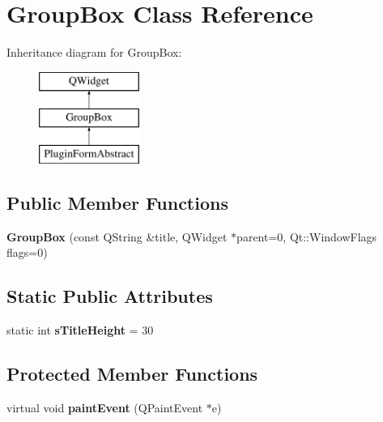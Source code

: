 \hypertarget{class_group_box}{\section{Group\-Box Class Reference}
\label{class_group_box}
}
Inheritance diagram for Group\-Box\-:\begin{figure}[H]
\begin{center}
\leavevmode
\includegraphics[height=3.000000cm]{class_group_box}
\end{center}
\end{figure}
\subsection*{Public Member Functions}
\begin{DoxyCompactItemize}
\item 
\hypertarget{class_group_box_a16c667e4f0668a9d33183fad889ca47a}{{\bfseries Group\-Box} (const Q\-String \&title, Q\-Widget $\ast$parent=0, Qt\-::\-Window\-Flags flags=0)}\label{class_group_box_a16c667e4f0668a9d33183fad889ca47a}

\end{DoxyCompactItemize}
\subsection*{Static Public Attributes}
\begin{DoxyCompactItemize}
\item 
\hypertarget{class_group_box_a91d1f6c4bc436acee6002d6213605c92}{static int {\bfseries s\-Title\-Height} = 30}\label{class_group_box_a91d1f6c4bc436acee6002d6213605c92}

\end{DoxyCompactItemize}
\subsection*{Protected Member Functions}
\begin{DoxyCompactItemize}
\item 
\hypertarget{class_group_box_adeb712e063515b4aa6275fd71d394514}{virtual void {\bfseries paint\-Event} (Q\-Paint\-Event $\ast$e)}\label{class_group_box_adeb712e063515b4aa6275fd71d394514}

\end{DoxyCompactItemize}
